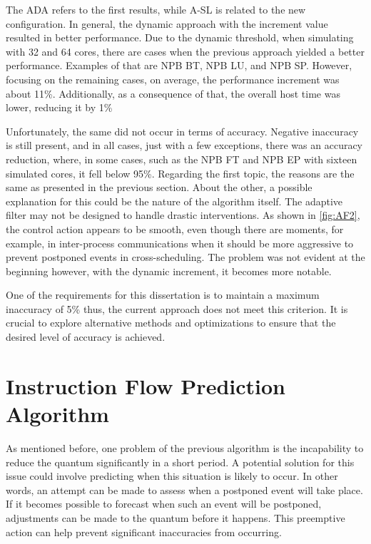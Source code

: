 The ADA refers to the first results, while A-SL is related to the new configuration. In general, the dynamic approach with the 
increment value resulted in better performance. Due to the dynamic threshold, when simulating with 32 and 64 cores, there are cases when the
previous approach yielded a better performance. Examples of that are NPB BT, NPB LU, and NPB SP. However, focusing on the remaining cases, 
on average, the performance increment was about 11\%. Additionally, as a consequence of that, the overall host 
time was lower, reducing it by 1\%

Unfortunately, the same did not occur in terms of accuracy. Negative inaccuracy is still present, and in all cases, just with a few exceptions, 
there was an accuracy reduction, where, in some cases, such as the NPB FT and NPB EP with sixteen simulated cores, it fell below 95\%. 
Regarding the first topic, the reasons are the same as presented in the previous section. About the other,  
a possible explanation for this could be the nature of the algorithm itself. The adaptive filter may not be designed to 
handle drastic interventions. As shown in \autoref{fig:AF2}, the control action appears to be smooth, even though there are moments, for example, 
in inter-process communications when it should be more aggressive to prevent postponed events in cross-scheduling. The problem was not evident at 
the beginning however, with the dynamic increment, it becomes more notable. 

One of the requirements for this dissertation is to maintain a maximum inaccuracy of 5\% thus, the current approach does not meet this criterion. 
It is crucial to explore alternative methods and optimizations to ensure that the desired level of accuracy is achieved.

\section{Instruction Flow Prediction Algorithm}

As mentioned before, one problem of the previous algorithm is the incapability to reduce the quantum significantly in a short period. A potential 
solution for this issue could involve predicting when this situation is likely to occur. In other words, an attempt can be made to assess when a 
postponed event will take place. If it becomes possible to forecast when such an event will be postponed, adjustments can be made to the quantum 
before it happens. This preemptive action can help prevent significant inaccuracies from occurring. 

